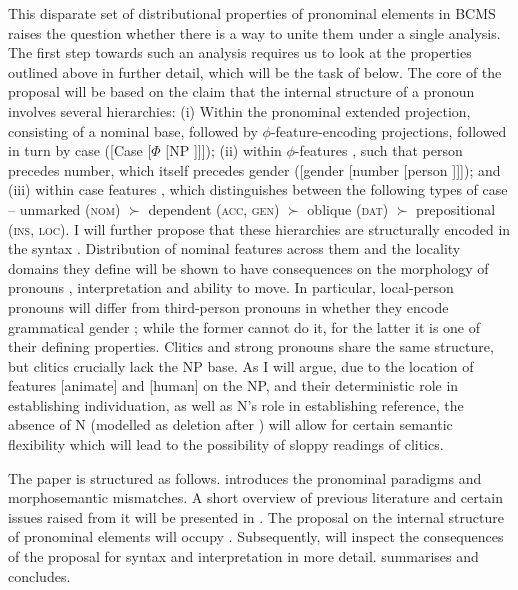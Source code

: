 \documentclass[output=paper,colorlinks,citecolor=brown]{langscibook}
\begin{document}
This disparate set of distributional properties of pronominal elements in BCMS raises the question whether there is a way to unite them under a single analysis. The first step towards such an analysis requires us to look at the properties outlined above in further detail, which will be the task of  below. 
The core of the proposal will be based on the claim that the internal structure of a pronoun involves several hierarchies: (i) Within the pronominal extended projection, consisting of a nominal base, followed by $\phi$-feature-encoding projections, followed in turn by case ([Case [$\Phi$ [NP ]]]); (ii) within $\phi$-features \citep{harleyritter02}, such that person precedes number, which itself precedes gender ([gender [number [person ]]]); and (iii) within case features \citep{cahadiss}, which distinguishes between the following types of case -- unmarked (\textsc{nom}) $\succ$ dependent (\textsc{acc}, \textsc{gen}) $\succ$ oblique (\textsc{dat}) $\succ$ prepositional (\textsc{ins}, \textsc{loc}).
I will further propose that these hierarchies are structurally encoded in the syntax \citep{bejarrezac09,vankoppen12}. Distribution of nominal features across them and the locality domains they define will be shown to have consequences on the morphology of pronouns \citep{moskal15}, interpretation and ability to move. In particular, local-person pronouns will differ from third-person pronouns in whether they encode grammatical gender \citep{puskarglossapredicate}; while the former cannot do it, for the latter it is one of their defining properties. Clitics and strong pronouns share the same structure, but clitics crucially lack the NP base. As I will argue, due to the location of features [animate] and [human] on the NP, and their deterministic role in establishing individuation, as well as N's role in establishing reference, the absence of N (modelled as deletion after \citealt{vanurkpronouns}) will allow for certain semantic flexibility which will lead to the possibility of sloppy readings of clitics. 

The paper is structured as follows.  introduces the pronominal paradigms and morphosemantic mismatches. A short overview of previous literature and certain issues raised from it will be presented in . The proposal on the internal structure of pronominal elements will occupy . Subsequently,   will inspect the consequences of the proposal for syntax and interpretation in more detail.  summarises and concludes. 
\end{document}
